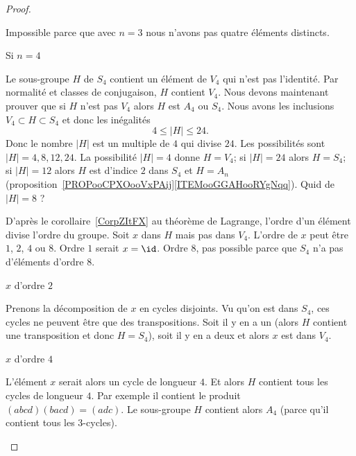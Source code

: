 \begin{proof}
\begin{subproof}
\begin{subproof}
                    Impossible parce que avec \( n=3\) nous n'avons pas quatre éléments distincts.

                \item[Si \( n=4\)]

                    Le sous-groupe \( H\) de \( S_4\) contient un élément de \( V_4\) qui n'est pas l'identité. Par normalité et classes de conjugaison, \( H\) contient \( V_4\). Nous devons maintenant prouver que si \( H\) n'est pas \( V_4\) alors \( H\) est \( A_4\) ou \( S_4\). Nous avons les inclusions \( V_4\subset H\subset S_4\) et donc les inégalités
                    \begin{equation}
                        4\leq | H |\leq 24.
                    \end{equation}
                    Donc le nombre \( | H |\) est un multiple de \( 4\) qui divise \( 24\). Les possibilités sont \( | H |=4,8,12,24\). La possibilité \( | H |=4\) donne \( H=V_4\); si \( |H |=24\) alors \( H=S_4\); si \( | H |=12\) alors \( H\) est d'indice \( 2\) dans \( S_4\) et \( H=A_n\) (proposition~\ref{PROPooCPXOooVxPAij}\ref{ITEMooGGAHooRYgNqq}). Quid de \( | H |=8\) ?

                    D'après le corollaire~\ref{CorpZItFX} au théorème de Lagrange, l'ordre d'un élément divise l'ordre du groupe. Soit \( x\) dans \( H\) mais pas dans \( V_4\). L'ordre de \( x\) peut être \( 1\), \( 2\), \( 4\) ou \( 8\). Ordre \( 1\) serait \( x=\id\). Ordre \( 8\), pas possible parce que \( S_4\) n'a pas d'éléments d'ordre \( 8\).
                    \begin{subproof}
                        \item[\( x\) d'ordre \( 2\)]

                            Prenons la décomposition de \( x\) en cycles disjoints. Vu qu'on est dans \( S_4\), ces cycles ne peuvent être que des transpositions. Soit il y en a un (alors \( H\) contient une transposition et donc \( H=S_4\)), soit il y en a deux et alors \( x\) est dans \( V_4\).

                        \item[\( x\) d'ordre \( 4\)]

                            L'élément \( x\) serait alors un cycle de longueur \( 4\). Et alors \( H\) contient tous les cycles de longueur \( 4\). Par exemple il contient le produit \( (abcd)(bacd)=(adc)\). Le sous-groupe \( H\) contient alors \( A_4\) (parce qu'il contient tous les \( 3\)-cycles).
                    \end{subproof}


\end{subproof}
\end{subproof}
\end{proof}
